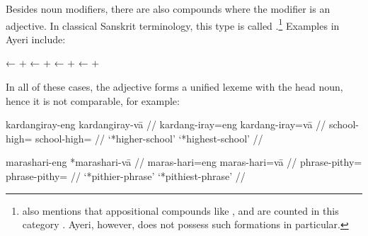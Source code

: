 Besides noun modifiers, there are also compounds where the modifier is an 
adjective. In classical Sanskrit terminology, this type is called 
 \citep[698--699]{bauer2001}.\footnote{\citeauthor{bauer2001} 
also mentions that appositional compounds like ,  and  are counted in this category 
\citep[699]{bauer2001}. Ayeri, however, does not possess such formations in 
particular.} Examples in Ayeri include:%

\pex
	\a {}
		← 
		+ 
	\a {}
		← 
		+ 
	\a {}
		← 
		+ 
	\a {}
		← 
		+ 
\xe

In all of these cases, the adjective forms a unified lexeme with the head noun, 
hence it is not comparable, for example:

\pex
\a\ljudge* \begingl
	\gla kardangiray-eng \quad{} kardangiray-vā //
	\glb kardang-iray=eng \quad{} kardang-iray=vā //
	\glc school-high=\Comp{} \quad{} school-high=\Supl{} //
	\glft `*higher-school' {} `*highest-school' //
\endgl

\a\ljudge* \begingl
	\gla marashari-eng \quad{} *marashari-vā //
	\glb maras-hari=eng \quad{} maras-hari=vā //
	\glc phrase-pithy=\Comp{} \quad{} phrase-pithy=\Supl{} //
	\glft `*pithier-phrase' {} `*pithiest-phrase' //
\endgl

\xe

